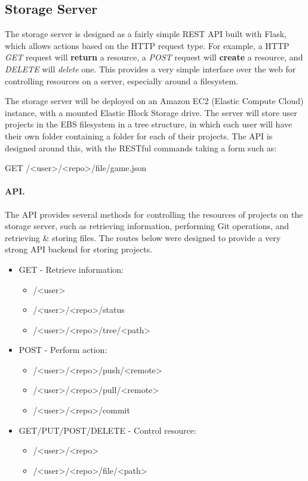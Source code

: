 	\subsection{Storage Server}
	\label{subsection:storageserverdesign}
	The storage server is designed as a fairly simple REST API built with Flask, which allows actions based on the HTTP request type. For example, a HTTP \emph{GET} request will \textbf{return} a resource, a \emph{POST} request will \textbf{create} a resource, and \emph{DELETE} will \emph{delete} one. This provides a very simple interface over the web for controlling resources on a server, especially around a filesystem.\cite{richardson2013restful}

	The storage server will be deployed on an Amazon EC2 (Elastic Compute Cloud) instance, with a mounted Elastic Block Storage drive. The server will store user projects in the EBS filesystem in a tree structure, in which each user will have their own folder containing a folder for each of their projects. The API is designed around this, with the RESTful commands taking a form such as:

	GET /<user>/<repo>/file/game.json

	\paragraph{API.}
	The API provides several methods for controlling the resources of projects on the storage server, such as retrieving information, performing Git operations, and retrieving \& storing files. The routes below were designed to provide a very strong API backend for storing projects.

	\begin{itemize}
		\item GET - Retrieve information:
		\begin{itemize}
			\item /<user>
			\item /<user>/<repo>/status
			\item /<user>/<repo>/tree/<path>
		\end{itemize}
		\item POST - Perform action:
		\begin{itemize}
			\item /<user>/<repo>/push/<remote>
			\item /<user>/<repo>/pull/<remote>
			\item /<user>/<repo>/commit
		\end{itemize}
		\item GET/PUT/POST/DELETE - Control resource:
		\begin{itemize}
			\item /<user>/<repo>
			\item /<user>/<repo>/file/<path>
		\end{itemize}
	\end{itemize}


